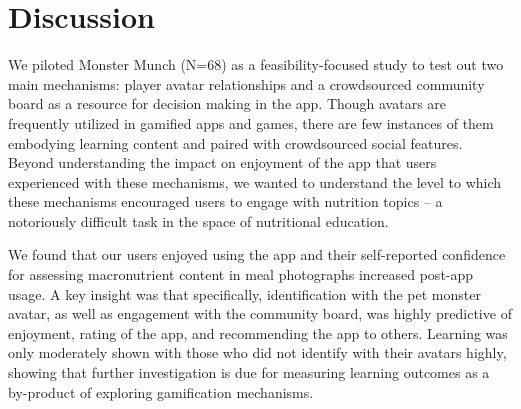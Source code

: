 \vspace{-5pt}
\section{Discussion}


We piloted Monster Munch (N=68) as a feasibility-focused study to test out two main mechanisms: player avatar relationships and a crowdsourced community board as a resource for decision making in the app. Though avatars are frequently utilized in gamified apps and games, there are few instances of them embodying learning content and paired with crowdsourced social features. Beyond understanding the impact on enjoyment of the app that users experienced with these mechanisms, we wanted to understand the level to which these mechanisms encouraged users to engage with nutrition topics -- a notoriously difficult task in the space of nutritional education.

We found that our users enjoyed using the app and their self-reported confidence for assessing macronutrient content in meal photographs increased post-app usage.
A key insight was that specifically, identification with the pet monster avatar, as well as engagement with the community board, was highly predictive of enjoyment, rating of the app, and recommending the app to others. 
Learning was only moderately shown with those who did not identify with their avatars highly, showing that further investigation is due for measuring learning outcomes as a by-product of exploring gamification mechanisms.  





